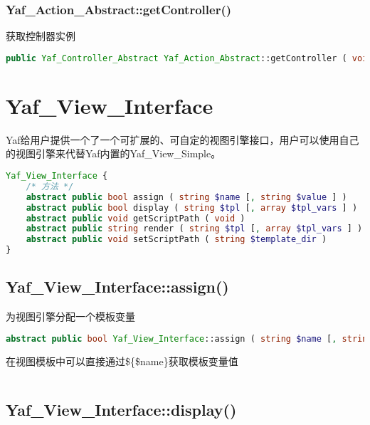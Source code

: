 \subsection{Yaf\_Action\_Abstract::getController()}

获取控制器实例



\begin{lstlisting}[language=PHP]
public Yaf_Controller_Abstract Yaf_Action_Abstract::getController ( void )
\end{lstlisting}





\chapter{Yaf\_View\_Interface}

Yaf给用户提供一个了一个可扩展的、可自定的视图引擎接口，用户可以使用自己的视图引擎来代替Yaf内置的Yaf\_View\_Simple。


\begin{lstlisting}[language=PHP]
Yaf_View_Interface {
    /* 方法 */
    abstract public bool assign ( string $name [, string $value ] )
    abstract public bool display ( string $tpl [, array $tpl_vars ] )
    abstract public void getScriptPath ( void )
    abstract public string render ( string $tpl [, array $tpl_vars ] )
    abstract public void setScriptPath ( string $template_dir )
}
\end{lstlisting}

\section{Yaf\_View\_Interface::assign()}

为视图引擎分配一个模板变量

\begin{lstlisting}[language=PHP]
abstract public bool Yaf_View_Interface::assign ( string $name [, string $value ] )
\end{lstlisting}

在视图模板中可以直接通过\$\{\$name\}获取模板变量值

\begin{lstlisting}[language=PHP]

\end{lstlisting}

\section{Yaf\_View\_Interface::display()}

